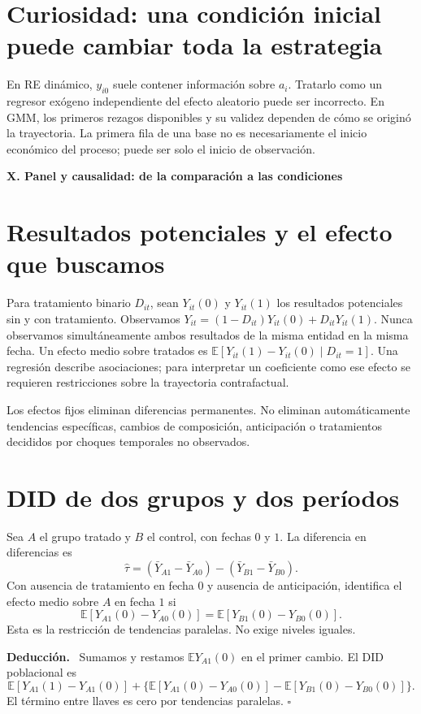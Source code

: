 \documentclass[11pt,a4paper]{article}
\newcommand{\E}{\mathbb E}
\newenvironment{deduccion}{\par\textbf{Deducción.}\ }{\hfill$\square$\par}
\theoremstyle{definition}
\newcommand{\parte}[1]{\par\bigskip\Needspace{8\baselineskip}\begin{center}{\Large\bfseries\color{azul}#1}\end{center}}
\begin{document}
\section{Curiosidad: una condición inicial puede cambiar toda la estrategia}
En RE dinámico, $y_{i0}$ suele contener información sobre $a_i$.
Tratarlo como un regresor exógeno independiente del efecto aleatorio puede ser incorrecto.
En GMM, los primeros rezagos disponibles y su validez dependen de cómo se originó la trayectoria.
La primera fila de una base no es necesariamente el inicio económico del proceso; puede ser solo el inicio de observación.



\parte{X. Panel y causalidad: de la comparación a las condiciones}
\section{Resultados potenciales y el efecto que buscamos}
Para tratamiento binario $D_{it}$, sean $Y_{it}(0)$ y $Y_{it}(1)$ los resultados potenciales sin y con tratamiento. Observamos
$Y_{it}=(1-D_{it})Y_{it}(0)+D_{it}Y_{it}(1)$.
Nunca observamos simultáneamente ambos resultados de la misma entidad en la misma fecha.
Un efecto medio sobre tratados es
$\E[Y_{it}(1)-Y_{it}(0)\mid D_{it}=1]$.
Una regresión describe asociaciones; para interpretar un coeficiente como ese efecto se requieren restricciones sobre la trayectoria contrafactual.

Los efectos fijos eliminan diferencias permanentes. No eliminan automáticamente tendencias específicas, cambios de composición, anticipación o tratamientos decididos por choques temporales no observados.

\section{DID de dos grupos y dos períodos}
Sea $A$ el grupo tratado y $B$ el control, con fechas $0$ y $1$.
La diferencia en diferencias es
\[
\widehat\tau
=(\bar Y_{A1}-\bar Y_{A0})-(\bar Y_{B1}-\bar Y_{B0}).
\]
Con ausencia de tratamiento en fecha $0$ y ausencia de anticipación, identifica el efecto medio sobre $A$ en fecha $1$ si
\[
\E[Y_{A1}(0)-Y_{A0}(0)]
=\E[Y_{B1}(0)-Y_{B0}(0)].
\]
Esta es la restricción de tendencias paralelas. No exige niveles iguales.

\begin{deduccion}
Sumamos y restamos $\E Y_{A1}(0)$ en el primer cambio. El DID poblacional es
\[
\E[Y_{A1}(1)-Y_{A1}(0)]
+\{\E[Y_{A1}(0)-Y_{A0}(0)]
-\E[Y_{B1}(0)-Y_{B0}(0)]\}.
\]
El término entre llaves es cero por tendencias paralelas.
\end{deduccion}
\end{document}
